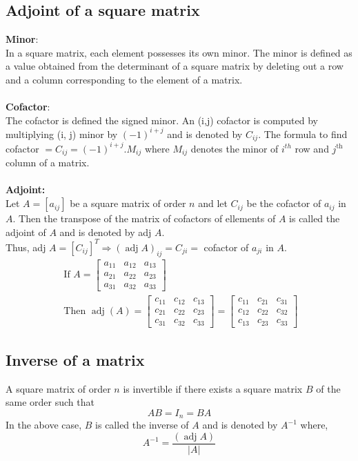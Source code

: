 \subsection{Adjoint of a square matrix}
\textbf{Minor}:\\In a square matrix, each element possesses its own minor. The minor is defined as a value obtained from the determinant of a square matrix by deleting out a row and a column corresponding to the element of a matrix.
\\\\\textbf{Cofactor}:\\ The cofactor is defined the signed minor. An (i,j) cofactor is computed by multiplying
(i, j) minor by $(-1)^{i+j}$ and is denoted by $C_{i j}$. The formula to find cofactor $=C_{i j}=(-1)^{i+j} . M_{i j}$ where $M_{i j}$ denotes the minor of $i^{t h}$ row and $j^{\text {th }}$ column of a matrix.
\\\\\textbf{Adjoint:}\\
Let $A=\left[a_{i j}\right]$ be a square matrix of order $n$ and let $C_{i j}$ be the cofactor of $a_{i j}$ in $A .$ Then the transpose of the matrix of cofactors of ellements of $A$ is called the adjoint of $A$ and is denoted by adj $A$.
\\Thus, adj $A=\left[C_{i j}\right]^{T} \Rightarrow(\operatorname{adj} A)_{i j}=C_{j i}=$ cofactor of
$a_{j i}$ in
$A .$
$$
\begin{array}{l}
	\text { If } A=\left[\begin{array}{lll}
		a_{11} & a_{12} & a_{13} \\
		a_{21} & a_{22} & a_{23} \\
		a_{31} & a_{32} & a_{33}
	\end{array}\right] \\
	\text { Then } \operatorname{adj}(A)=\left[\begin{array}{lll}
		c_{11} & c_{12} & c_{13} \\
		c_{21} & c_{22} & c_{23} \\
		c_{31} & c_{32} & c_{33}
	\end{array}\right]=\left[\begin{array}{lll}
		c_{11} & c_{21} & c_{31} \\
		c_{12} & c_{22} & c_{32} \\
		c_{13} & c_{23} & c_{33}
	\end{array}\right]
\end{array}
$$
\subsection{Inverse of a matrix}
A square matrix of order $n$ is invertible if there exists a square matrix $B$ of the same order such that
$$
A B=I_{n}=B A
$$
In the above case, $B$ is called the inverse of $A$ and is denoted by $A^{-1}$ where,
$$
A^{-1}=\frac{(\operatorname{adj} A)}{|A|}
$$

